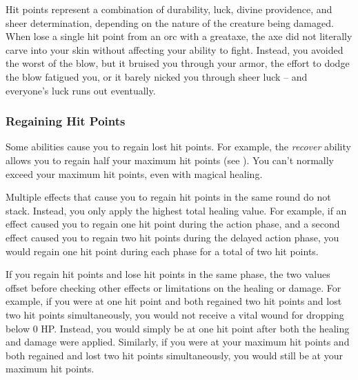          Hit points represent a combination of durability, luck, divine providence, and sheer determination, depending on the nature of the creature being damaged.
        When lose a single hit point from an orc with a greataxe, the axe did not literally carve into your skin without affecting your ability to fight.
        Instead, you avoided the worst of the blow, but it bruised you through your armor, the effort to dodge the blow fatigued you, or it barely nicked you through sheer luck -- and everyone's luck runs out eventually.


        \subsubsection{Regaining Hit Points}\label{Regaining Hit Points}
            Some abilities cause you to regain lost hit points.
            For example, the \textit{recover} ability allows you to regain half your maximum hit points (see ).
            You can't normally exceed your maximum hit points, even with magical healing.

             Multiple effects that cause you to regain hit points in the same round do not stack.
            Instead, you only apply the highest total healing value.
            For example, if an effect caused you to regain one hit point during the action phase, and a second effect caused you to regain two hit points during the delayed action phase, you would regain one hit point during each phase for a total of two hit points.

             If you regain hit points and lose hit points in the same phase, the two values offset before checking other effects or limitations on the healing or damage.
            For example, if you were at one hit point and both regained two hit points and lost two hit points simultaneously, you would not receive a vital wound for dropping below 0 HP.
            Instead, you would simply be at one hit point after both the healing and damage were applied.
            Similarly, if you were at your maximum hit points and both regained and lost two hit points simultaneously, you would still be at your maximum hit points.

